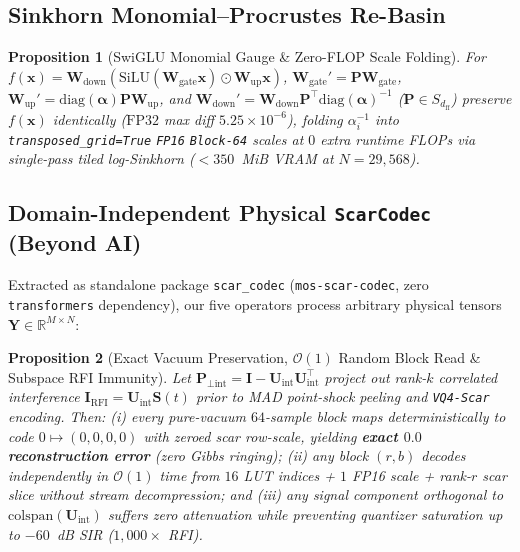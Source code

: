 \documentclass[10pt,twocolumn]{article}
\newtheorem{proposition}{Proposition}
\begin{document}
\subsection{Sinkhorn Monomial--Procrustes Re-Basin}
\begin{proposition}[SwiGLU Monomial Gauge \& Zero-FLOP Scale Folding]
\label{prop:rebasin}
For $f(\mathbf{x}) = \mathbf{W}_{\text{down}}(\mathrm{SiLU}(\mathbf{W}_{\text{gate}}\mathbf{x}) \odot \mathbf{W}_{\text{up}}\mathbf{x})$, $\mathbf{W}_{\text{gate}}' = \mathbf{P}\mathbf{W}_{\text{gate}}$, $\mathbf{W}_{\text{up}}' = \mathrm{diag}(\boldsymbol{\alpha})\mathbf{P}\mathbf{W}_{\text{up}}$, and $\mathbf{W}_{\text{down}}' = \mathbf{W}_{\text{down}}\mathbf{P}^\top\mathrm{diag}(\boldsymbol{\alpha})^{-1}$ ($\mathbf{P} \in S_{d_{\text{ff}}}$) preserve $f(\mathbf{x})$ identically ($\mathrm{FP32}$ max diff $5.25 \times 10^{-6}$), folding $\alpha_i^{-1}$ into \texttt{transposed\_grid=True} \texttt{FP16} \texttt{Block-64} scales at $0$ extra runtime FLOPs via single-pass tiled log-Sinkhorn ($<350$~MiB VRAM at $N=29{,}568$).
\end{proposition}

\subsection{Domain-Independent Physical \texttt{ScarCodec} (Beyond AI)}
Extracted as standalone package \texttt{scar\_codec} (\texttt{mos-scar-codec}, zero \texttt{transformers} dependency), our five operators process arbitrary physical tensors $\mathbf{Y} \in \mathbb{R}^{M \times N}$:
\begin{proposition}[Exact Vacuum Preservation, $\mathcal{O}(1)$ Random Block Read \& Subspace RFI Immunity]
\label{prop:vq4_pperp}
Let $\mathbf{P}_{\perp\text{int}} = \mathbf{I} - \mathbf{U}_{\text{int}}\mathbf{U}_{\text{int}}^\top$ project out rank-$k$ correlated interference $\mathbf{I}_{\text{RFI}} = \mathbf{U}_{\text{int}}\mathbf{S}(t)$ prior to MAD point-shock peeling and \texttt{VQ4-Scar} encoding. Then: (i) every pure-vacuum $64$-sample block maps deterministically to code $0 \mapsto (0,0,0,0)$ with zeroed scar row-scale, yielding \textbf{exact $0.0$ reconstruction error} (zero Gibbs ringing); (ii) any block $(r, b)$ decodes independently in $\mathcal{O}(1)$ time from $16$ LUT indices + $1$ FP16 scale + rank-$r$ scar slice without stream decompression; and (iii) any signal component orthogonal to $\mathrm{colspan}(\mathbf{U}_{\text{int}})$ suffers zero attenuation while preventing quantizer saturation up to $-60$~dB SIR ($1{,}000\times$ RFI).
\end{proposition}
\end{document}
